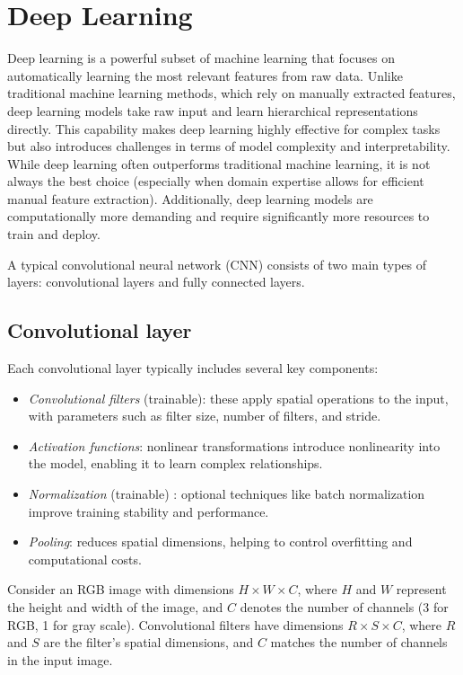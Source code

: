 \section{Deep Learning}

Deep learning is a powerful subset of machine learning that focuses on automatically learning the most relevant features from raw data. 
Unlike traditional machine learning methods, which rely on manually extracted features, deep learning models take raw input and learn hierarchical representations directly. 
This capability makes deep learning highly effective for complex tasks but also introduces challenges in terms of model complexity and interpretability. 
While deep learning often outperforms traditional machine learning, it is not always the best choice (especially when domain expertise allows for efficient manual feature extraction). 
Additionally, deep learning models are computationally more demanding and require significantly more resources to train and deploy.

A typical convolutional neural network (CNN) consists of two main types of layers: convolutional layers and fully connected layers.

\subsection{Convolutional layer}
Each convolutional layer typically includes several key components:
\begin{itemize}
    \item \textit{Convolutional filters} (trainable): these apply spatial operations to the input, with parameters such as filter size, number of filters, and stride.
    \item \textit{Activation functions}: nonlinear transformations introduce nonlinearity into the model, enabling it to learn complex relationships.
    \item \textit{Normalization} (trainable) : optional techniques like batch normalization improve training stability and performance.
    \item \textit{Pooling}: reduces spatial dimensions, helping to control overfitting and computational costs.
\end{itemize}
Consider an RGB image with dimensions $H\times W \times C$, where $H$ and $W$ represent the height and width of the image, and $C$ denotes the number of channels (3 for RGB, 1 for gray scale).
Convolutional filters have dimensions $R\times S\times C$, where $R$ and $S$ are the filter's spatial dimensions, and $C$ matches the number of channels in the input image.

